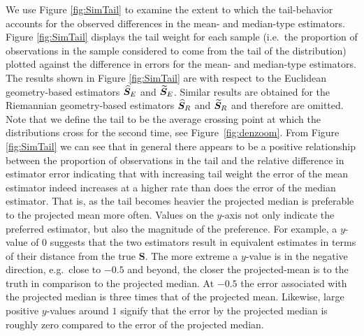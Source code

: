 
We use Figure \ref{fig:SimTail} to examine the  extent to which the tail-behavior accounts for the observed differences in the mean- and median-type estimators. Figure \ref{fig:SimTail} displays the tail weight for each sample (i.e.~the proportion of observations in the sample considered to come from the tail of the distribution) plotted against the difference in errors for the mean- and median-type estimators.  The results shown in Figure \ref{fig:SimTail} are with respect to the Euclidean geometry-based estimators ${\widehat{\bm S}_E}$ and ${\widetilde{\bm S}_E}$. Similar results are obtained for the Riemannian geometry-based estimators ${\widehat{\bm S}_R}$ and ${\widetilde{\bm S}_R}$ and therefore are omitted. Note that we define the tail to be the average crossing point at which the distributions cross for the second time, see Figure~\ref{fig:denzoom}. From  Figure \ref{fig:SimTail} we can see that in general there appears to be a positive relationship between the proportion of observations in the tail and the relative difference in estimator error indicating that with increasing tail weight the error of the mean estimator indeed increases at a higher rate than does the error of the median estimator. That is, as the tail becomes heavier the projected median is preferable to the projected mean more often.  Values on the $y$-axis not only indicate the preferred estimator, but also the magnitude of the preference.  For example, a $y$-value of 0 suggests that the two estimators result in equivalent estimates in terms of their distance from the true $\bm S$.  The more extreme a $y$-value is in the negative direction, e.g.~close to $-0.5$ and beyond, the closer the projected-mean is to the truth in comparison to the projected median. At $-0.5$ the error associated with the projected median is three times that of the projected mean.  Likewise,  large positive $y$-values around $1$ signify that the error by the projected median is roughly zero compared to the error of the projected median.


